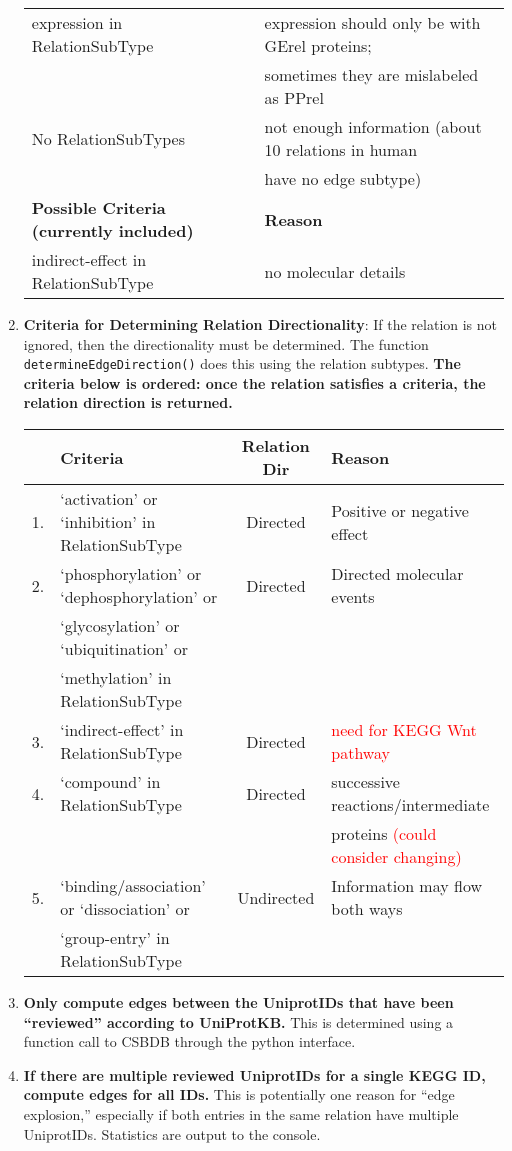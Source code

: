 \documentclass[10pt]{article}
\begin{document}
\begin{enumerate}
\begin{center}
\begin{tabular}{l|l}
expression in RelationSubType & expression should only be with GErel proteins; \\
 & sometimes they are mislabeled as PPrel\\
No RelationSubTypes & not enough information (about 10 relations in human \\
 &  have no edge subtype) \\ \hline
\textbf{Possible Criteria (currently included)} & \textbf{Reason} \\ \hline
indirect-effect in RelationSubType & no molecular details 
\end{tabular}
\end{center}
\item \textbf{Criteria for Determining Relation Directionality}: If the relation is not ignored, then the directionality must be determined.  The function \texttt{determineEdgeDirection()} does this using the relation subtypes.
\textbf{The criteria below is ordered: once the relation satisfies a criteria, the relation direction is returned.}
\begin{center}
\begin{tabular}{ll|c|l}
& \textbf{Criteria} & \textbf{Relation Dir} & \textbf{Reason} \\ \hline
1. & `activation' or `inhibition' in RelationSubType & Directed & Positive or negative effect\\
2. & `phosphorylation' or `dephosphorylation' or & Directed & Directed molecular events\\
& `glycosylation' or `ubiquitination' or & \\
& `methylation' in RelationSubType & & \\
3. & `indirect-effect' in RelationSubType & Directed & \textcolor{red}{need for KEGG Wnt pathway} \\
4. & `compound' in RelationSubType & Directed & successive reactions/intermediate \\
& & & proteins \textcolor{red}{(could consider changing)}\\
5. & `binding/association' or `dissociation' or & Undirected & Information may flow both ways\\
 & `group-entry' in RelationSubType  && \\
\end{tabular}
\end{center}
\item \textbf{Only compute edges between the UniprotIDs that have been ``reviewed'' according to UniProtKB.}  This is determined using a function call to CSBDB through the python interface.
\item \textbf{If there are multiple reviewed UniprotIDs for a single KEGG ID, compute edges for all IDs.} This is potentially one reason for ``edge explosion,'' especially if both entries in the same relation have multiple UniprotIDs. Statistics are output to the console.
\end{enumerate}
\end{document}
